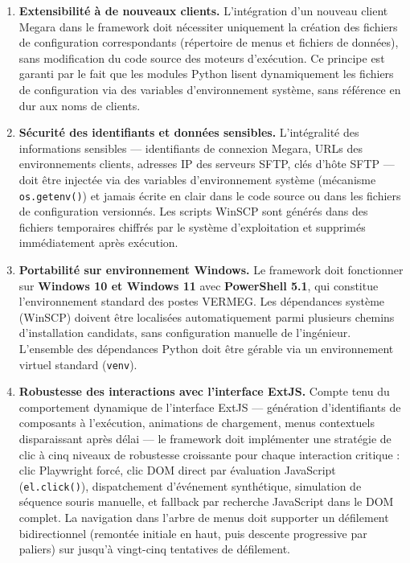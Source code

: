 \documentclass[12pt, a4paper]{report}
\begin{document}
\begin{enumerate}[label=\textbf{BNF\arabic*.}, leftmargin=*, itemsep=6pt]
  \item \textbf{Extensibilité à de nouveaux clients.}
  L'intégration d'un nouveau client Megara dans le framework doit nécessiter uniquement la création des fichiers de configuration correspondants (répertoire de menus et fichiers de données), sans modification du code source des moteurs d'exécution. Ce principe est garanti par le fait que les modules Python lisent dynamiquement les fichiers de configuration via des variables d'environnement système, sans référence en dur aux noms de clients.

  \item \textbf{Sécurité des identifiants et données sensibles.}
  L'intégralité des informations sensibles — identifiants de connexion Megara, URLs des environnements clients, adresses IP des serveurs SFTP, clés d'hôte SFTP — doit être injectée via des variables d'environnement système (mécanisme \texttt{os.getenv()}) et jamais écrite en clair dans le code source ou dans les fichiers de configuration versionnés. Les scripts WinSCP sont générés dans des fichiers temporaires chiffrés par le système d'exploitation et supprimés immédiatement après exécution.

  \item \textbf{Portabilité sur environnement Windows.}
  Le framework doit fonctionner sur \textbf{Windows 10 et Windows 11} avec \textbf{PowerShell 5.1}, qui constitue l'environnement standard des postes VERMEG. Les dépendances système (WinSCP) doivent être localisées automatiquement parmi plusieurs chemins d'installation candidats, sans configuration manuelle de l'ingénieur. L'ensemble des dépendances Python doit être gérable via un environnement virtuel standard (\texttt{venv}).

  \item \textbf{Robustesse des interactions avec l'interface ExtJS.}
  Compte tenu du comportement dynamique de l'interface ExtJS — génération d'identifiants de composants à l'exécution, animations de chargement, menus contextuels disparaissant après délai — le framework doit implémenter une stratégie de clic à cinq niveaux de robustesse croissante pour chaque interaction critique : clic Playwright forcé, clic DOM direct par évaluation JavaScript (\texttt{el.click()}), dispatchement d'événement synthétique, simulation de séquence souris manuelle, et fallback par recherche JavaScript dans le DOM complet. La navigation dans l'arbre de menus doit supporter un défilement bidirectionnel (remontée initiale en haut, puis descente progressive par paliers) sur jusqu'à vingt-cinq tentatives de défilement.

\end{enumerate}
\end{document}
